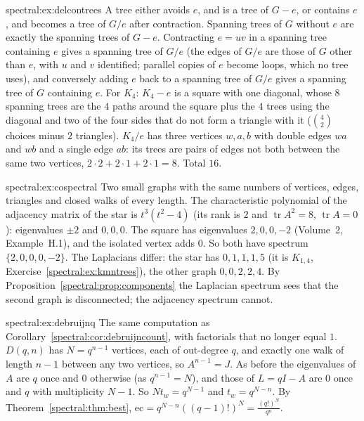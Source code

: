 \begin{solution}{spectral:ex:delcontrees}
\idea A tree either avoids $e$, and is a tree of $G-e$, or contains $e$, and becomes a tree of $G/e$ after contraction.
\writeup Spanning trees of $G$ without $e$ are exactly the spanning trees of $G-e$. Contracting $e=uv$ in a spanning tree containing $e$ gives a spanning tree of $G/e$ (the edges of $G/e$ are those of $G$
other than $e$, with $u$ and $v$ identified; parallel copies of $e$ become loops, which no tree uses), and conversely adding $e$ back to a spanning tree of $G/e$ gives a spanning tree of $G$ containing $e$.
For $K_4$: $K_4-e$ is a square with one diagonal, whose $8$ spanning trees are the $4$ paths around the square plus the $4$ trees using the diagonal and two of the four sides that do not form a
triangle with it ($\binom42$ choices minus $2$ triangles). $K_4/e$ has three vertices $w,a,b$ with double edges $wa$ and $wb$ and a single edge $ab$: its trees are pairs of edges not both between the same
two vertices, $2\cdot2+2\cdot1+2\cdot1=8$. Total $16$.
\end{solution}

\begin{solution}{spectral:ex:cospectral}
\idea Two small graphs with the same numbers of vertices, edges, triangles and closed walks of every length.
\writeup The characteristic polynomial of the adjacency matrix of the star is $t^3(t^2-4)$ (its rank is $2$ and $\operatorname{tr}A^2=8$, $\operatorname{tr}A=0$): eigenvalues $\pm2$ and $0,0,0$. The square has eigenvalues $2,0,0,-2$ (Volume~2, Example~H.1), and the isolated vertex
adds $0$. So both have spectrum $\{2,0,0,0,-2\}$. The Laplacians differ: the star has $0,1,1,1,5$ (it is $K_{1,4}$, Exercise~\ref{spectral:ex:kmntrees}), the other graph $0,0,2,2,4$. By Proposition~\ref{spectral:prop:components} the
Laplacian spectrum sees that the second graph is disconnected; the adjacency spectrum cannot.
\end{solution}

\begin{solution}{spectral:ex:debruijnq}
\idea The same computation as Corollary~\ref{spectral:cor:debruijncount}, with factorials that no longer equal $1$.
\writeup $D(q,n)$ has $N=q^{n-1}$ vertices, each of out-degree $q$, and exactly one walk of length $n-1$ between any two vertices, so $A^{n-1}=J$. As before the eigenvalues of $A$ are $q$ once and $0$ otherwise
(as $q^{n-1}=N$), and those of $L=qI-A$ are $0$ once and $q$ with multiplicity $N-1$. So $Nt_w=q^{N-1}$ and $t_w=q^{N-n}$. By Theorem~\ref{spectral:thm:best}, $\mathrm{ec}=q^{N-n}((q-1)!)^N=\frac{(q!)^N}{q^n}$.
\end{solution}

